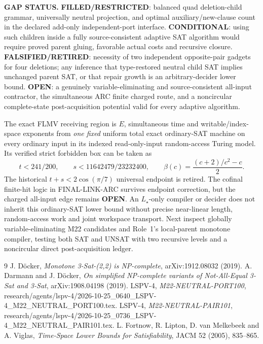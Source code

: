\documentclass[11pt]{article}
\begin{document}
\noindent\textbf{GAP STATUS.} \textbf{FILLED/RESTRICTED}: balanced quad deletion-child grammar, universally neutral projection, and optimal auxiliary/new-clause count in the declared add-only independent-port interface. \textbf{CONDITIONAL}: using such children inside a fully source-consistent adaptive SAT algorithm would require proved parent gluing, favorable actual costs and recursive closure. \textbf{FALSIFIED/RETIRED}: necessity of two independent opposite-pair gadgets for four deletions; any inference that type-restored neutral child SAT implies unchanged parent SAT, or that repair growth is an arbitrary-decider lower bound. \textbf{OPEN}: a genuinely variable-eliminating and source-consistent all-input contractor, the simultaneous ARC finite charged route, and a noncircular complete-state post-acquisition potential valid for every adaptive algorithm.

The exact FLMV receiving region is \(E\), simultaneous time and writable/index-space exponents from \emph{one fixed} uniform total exact ordinary-SAT machine on every ordinary input in its indexed read-only-input random-access Turing model. Its verified strict forbidden box can be taken as
\[
t<241/200,\qquad
s<11642479/23232400,\qquad
\beta(c)=\frac{(c+2)/c^2-c}{2}.
\]
The historical \(t+s<2\cos(\pi/7)\) universal endpoint is retired. The cofinal finite-hit logic in FINAL-LINK-ARC survives endpoint correction, but the charged all-input edge remains \textbf{OPEN}. An \(L_\star\)-only compiler or decider does not inherit this ordinary-SAT lower bound without precise near-linear length, random-access work and joint workspace transport. Next inspect globally variable-eliminating M22 candidates and Role~1's local-parent monotone compiler, testing both SAT and UNSAT with two recursive levels and a noncircular direct post-acquisition ledger.

\begin{thebibliography}{9}
 J. D\"ocker, \emph{Monotone 3-Sat-(2,2) is NP-complete}, arXiv:1912.08032 (2019).
 A. Darmann and J. D\"ocker, \emph{On simplified NP-complete variants of Not-All-Equal 3-Sat and 3-Sat}, arXiv:1908.04198 (2019).
 LSPV-4, \emph{M22-NEUTRAL-PORT100}, research/agents/lspv-4/2026-10-25\_0640\_LSPV-4\_M22\_NEUTRAL\_PORT100.tex.
 LSPV-4, \emph{M22-NEUTRAL-PAIR101}, research/agents/lspv-4/2026-10-25\_0736\_LSPV-4\_M22\_NEUTRAL\_PAIR101.tex.
 L. Fortnow, R. Lipton, D. van Melkebeek and A. Viglas, \emph{Time-Space Lower Bounds for Satisfiability}, JACM 52 (2005), 835--865.
\end{thebibliography}
\end{document}
